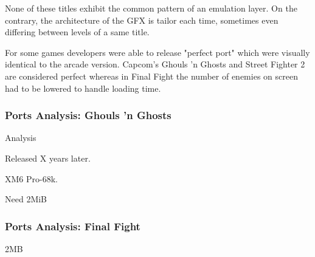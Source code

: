 None of these titles exhibit the common pattern of an emulation layer. On the contrary, the architecture of the GFX is tailor each time, sometimes even differing between levels of a same title. 




 For some games developers were able to release "perfect port" which were visually identical to the arcade version. Capcom's Ghouls 'n Ghosts and Street Fighter 2 are considered perfect whereas in Final Fight the number of enemies on screen had to be lowered to handle loading time.

\pagebreak



\subsubsection{Ports Analysis: Ghouls 'n Ghosts}
 Analysis\cite{x68k_games_analysis}

Released X years later.

XM6 Pro-68k.

Need 2MiB


\begin{minipage}[t]{0.49\linewidth}
\end{minipage}%
\hfill
\begin{minipage}[t]{0.49\linewidth}
\end{minipage}%

\begin{minipage}[t]{0.49\linewidth}
\end{minipage}%
\hfill
\begin{minipage}[t]{0.49\linewidth}
\end{minipage}%


\pagebreak

\subsubsection{Ports Analysis: Final Fight}

2MB







